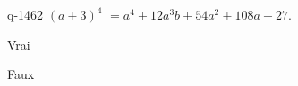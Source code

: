 \begin{truefalse}{q-1462}
$(a+3)^4$ $=a^4+12a^3b+54a^2+108a+27$.
\item Vrai
\item* Faux
\end{truefalse}

